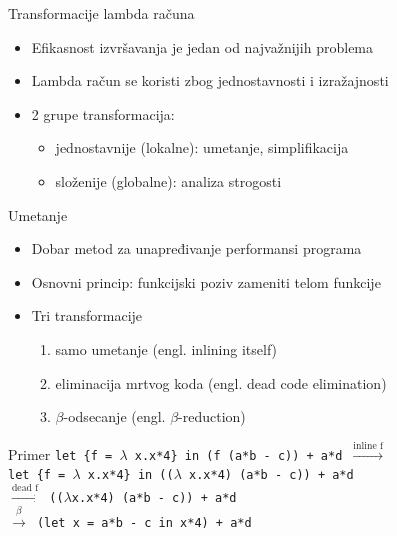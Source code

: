 \documentclass[xcolor={dvipsnames}, 11pt]{beamer}
\begin{document}
\begin{frame}{Transformacije lambda računa}
	\begin{itemize}
		\item Efikasnost izvršavanja je jedan od najvažnijih problema
		\item Lambda račun se koristi zbog jednostavnosti i izražajnosti
		\item 2 grupe transformacija:
		\begin{itemize}
			\item jednostavnije (lokalne): umetanje, simplifikacija 
			\item složenije (globalne): analiza strogosti
		\end{itemize}
	\end{itemize}
\end{frame}

\begin{frame}{Umetanje}
	\begin{itemize}
		\item Dobar metod za unapređivanje performansi programa	
		\item Osnovni princip: funkcijski poziv zameniti telom funkcije
		\item Tri transformacije
		\begin{enumerate}
			\item samo umetanje (engl. inlining itself)
			\item eliminacija mrtvog koda (engl. dead code elimination)
			\item $\beta$-odsecanje (engl. $\beta$-reduction)
		\end{enumerate}
	\end{itemize}
	
	\begin{block}{Primer}
		\texttt{let \{f = $\lambda$ x.x*4\} in (f (a*b - c)) + a*d
			$\stackrel{\text{inline f}}{\longrightarrow}$ \\ let \{f = $\lambda$ x.x*4\} in (($\lambda$ x.x*4) (a*b - c)) + a*d \\ $\stackrel{\text{dead f}}{\longrightarrow}$ (($\lambda$x.x*4) (a*b - c)) + a*d \\
			$\stackrel{\beta}{\longrightarrow}$ (let {x = a*b - c} in x*4) + a*d}
	\end{block}

	
\end{frame}
\end{document}
